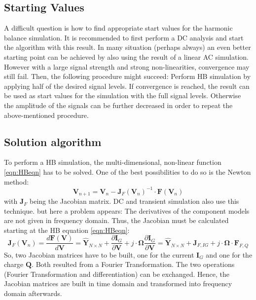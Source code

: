 \subsection{Starting Values}

A difficult question is how to find appropriate start values for the
harmonic balance simulation. It is recommended to first perform a DC
analysis and start the algorithm with this result. In many situation
(perhaps always) an even better starting point can be achieved by
also using the result of a linear AC simulation. However with a large
signal strength and strong non-linearities, convergence may still
fail. Then, the following procedure might succeed: Perform HB
simulation by applying half of the desired signal levels. If convergence
is reached, the result can be used as start values for the simulation
with the full signal levels. Otherwise the amplitude of the signals can
be further decreased in order to repeat the above-mentioned procedure.


\subsection{Solution algorithm}

To perform a HB simulation, the multi-dimensional, non-linear function
\ref{eqn:HBeqn} has to be solved. One of the best possibilities to
do so is the Newton method:
\begin{equation}
\textbf{V}_{n+1} = \textbf{V}_n - \textbf{J}_F (\textbf{V}_n)^{-1}
                   \cdot \textbf{F} (\textbf{V}_n)
\end{equation}
with $\textbf{J}_F$ being the Jacobian matrix. DC and transient
simulation also use this technique. but here a problem appears:
The derivatives of the component models are not given in frequency
domain. Thus, the Jacobian must be calculated starting at the HB
equation \ref{eqn:HBeqn}:
\begin{equation}
\boldsymbol{J}_F (\boldsymbol{V}_n) = \frac{d\boldsymbol{F} (\boldsymbol{V})}{d\boldsymbol{V}}
    = \boldsymbol{\hat{Y}}_{N \times N} + \frac{\partial \boldsymbol{I}_G}{\partial \boldsymbol{V}}
     + j\cdot \boldsymbol{\Omega}\frac{\partial \boldsymbol{I}_G}{\partial \boldsymbol{V}}
    = \boldsymbol{\hat{Y}}_{N \times N} + \boldsymbol{J}_{F,IG}
     + j\cdot \boldsymbol{\Omega}\cdot\boldsymbol{F}_{F,Q}
\end{equation}
So, two Jacobian matrices have to be built, one for the current
$\boldsymbol{I}_G$ and one for the charge $\boldsymbol{Q}$. Both resulted
from a Fourier Transformation. The two operations (Fourier Transformation
and differentiation) can be exchanged. Hence, the Jacobian matrices
are built in time domain and transformed into frequency domain afterwards.

